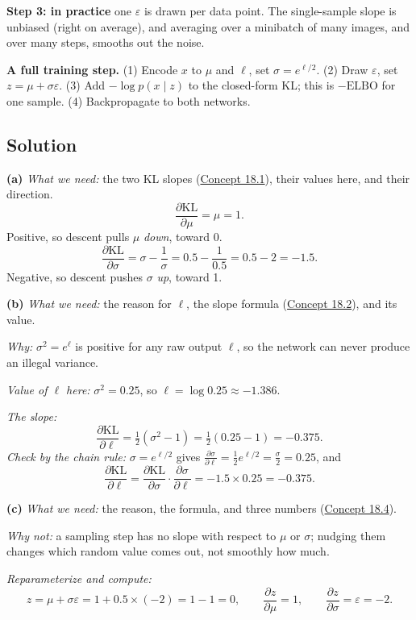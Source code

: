 \documentclass[12pt,a4paper]{article}
\begin{document}
\textbf{Step 3: in practice} one $\varepsilon$ is drawn per data point. The single-sample slope is unbiased (right on average), and averaging over a minibatch of many images, and over many steps, smooths out the noise.

\textbf{A full training step.} (1) Encode $x$ to $\mu$ and $\ell$, set $\sigma=e^{\ell/2}$. (2) Draw $\varepsilon$, set $z=\mu+\sigma\varepsilon$. (3) Add $-\log p(x\mid z)$ to the closed-form KL; this is $-\text{ELBO}$ for one sample. (4) Backpropagate to both networks.

\subsection{Solution}

\textbf{(a)} \emph{What we need:} the two KL slopes (\hyperref[c18-1]{Concept 18.1}), their values here, and their direction.
\[
\frac{\partial\mathrm{KL}}{\partial\mu}=\mu=1 .
\]
Positive, so descent pulls $\mu$ \emph{down}, toward 0.
\[
\frac{\partial\mathrm{KL}}{\partial\sigma}=\sigma-\frac1\sigma=0.5-\frac{1}{0.5}=0.5-2=-1.5 .
\]
Negative, so descent pushes $\sigma$ \emph{up}, toward 1.

\textbf{(b)} \emph{What we need:} the reason for $\ell$, the slope formula (\hyperref[c18-2]{Concept 18.2}), and its value.

\emph{Why:} $\sigma^2=e^\ell$ is positive for any raw output $\ell$, so the network can never produce an illegal variance.

\emph{Value of $\ell$ here:} $\sigma^2=0.25$, so $\ell=\log0.25\approx-1.386$.

\emph{The slope:}
\[
\frac{\partial\mathrm{KL}}{\partial\ell}=\tfrac12(\sigma^2-1)=\tfrac12(0.25-1)=-0.375 .
\]
\emph{Check by the chain rule:} $\sigma=e^{\ell/2}$ gives $\frac{\partial\sigma}{\partial\ell}=\frac12e^{\ell/2}=\frac\sigma2=0.25$, and
\[
\frac{\partial\mathrm{KL}}{\partial\ell}=\frac{\partial\mathrm{KL}}{\partial\sigma}\cdot\frac{\partial\sigma}{\partial\ell}=-1.5\times0.25=-0.375 .
\]

\textbf{(c)} \emph{What we need:} the reason, the formula, and three numbers (\hyperref[c18-4]{Concept 18.4}).

\emph{Why not:} a sampling step has no slope with respect to $\mu$ or $\sigma$; nudging them changes which random value comes out, not smoothly how much.

\emph{Reparameterize and compute:}
\[
z=\mu+\sigma\varepsilon=1+0.5\times(-2)=1-1=0,\qquad\frac{\partial z}{\partial\mu}=1,\qquad\frac{\partial z}{\partial\sigma}=\varepsilon=-2 .
\]
\end{document}

